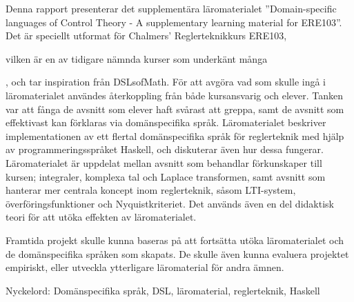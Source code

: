 Denna rapport presenterar det supplementära läromaterialet ''Domain-specific languages of Control Theory - A supplementary learning material for ERE103''. Det är speciellt utformat för Chalmers' Reglerteknikkurs ERE103, \begin{newtext}vilken är en av tidigare nämnda kurser som underkänt många\end{newtext}, och tar inspiration från DSLsofMath. För att avgöra vad som skulle ingå i läromaterialet användes återkoppling från både kursansvarig och elever. Tanken var att fånga de avsnitt som elever haft svårast att greppa, samt de avsnitt som effektivast kan förklaras via domänspecifika språk. Läromaterialet beskriver implementationen av ett flertal domänspecifika språk för reglerteknik med hjälp av programmeringsspråket Haskell, och diskuterar även hur dessa fungerar. Läromaterialet är uppdelat mellan avsnitt som behandlar förkunskaper till kursen; integraler, komplexa tal och Laplace transformen, samt avsnitt som hanterar mer centrala koncept inom reglerteknik, såsom LTI-system, överföringsfunktioner och Nyquistkriteriet. Det används även en del didaktisk teori för att utöka effekten av läromaterialet.

Framtida projekt skulle kunna baseras på att fortsätta utöka läromaterialet och de domänspecifika språken som skapats. De skulle även kunna evaluera projektet empiriskt, eller utveckla ytterligare läromaterial för andra ämnen.

\vfill
\noindent Nyckelord: Domänspecifika språk, DSL, läromaterial, reglerteknik, Haskell